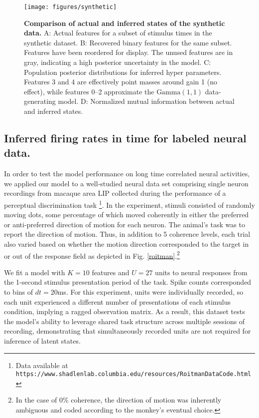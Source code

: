 \documentclass{nature}
\begin{document}
\begin{figure}
    \texttt{[image: figures/synthetic]}
	\caption{\textbf{Comparison of actual and inferred states of the synthetic data.} A: Actual features for a subset of stimulus times in the synthetic dataset. B: Recovered binary features for the same subset. Features have been reordered for display. The unused features are in gray, indicating a high posterior uncertainty in the model. C: Population posterior distributions for inferred hyper parameters. Features 3 and 4 are effectively point masses around gain 1 (no effect), while features 0--2 approximate the $\text{Gamma}(1, 1)$ data-generating model. D: Normalized mutual information between actual and inferred states.}
	\label{synthetic}
\end{figure}

\subsection{Inferred firing rates in time for labeled neural data.}
In order to test the model performance on long time correlated neural activities, we applied our model to a well-studied neural data set comprising single neuron recordings from macaque area LIP collected during the performance of a perceptual discrimination task \cite{roitman2002response}\footnote{Data available at \texttt{https://www.shadlenlab.columbia.edu/resources/RoitmanDataCode.html}}. In the experiment, stimuli consisted of randomly moving dots, some percentage of which moved coherently in either the preferred or anti-preferred direction of motion for each neuron. The animal's task was to report the direction of motion. Thus, in addition to 5 coherence levels, each trial also varied based on whether the motion direction corresponded to the target in or out of the response field as depicted in Fig. \ref{roitman}.\footnote{In the case of 0\% coherence, the direction of motion was inherently ambiguous and coded according to the monkey's eventual choice.}

We fit a model with $K = 10$ features and $U = 27$ units to neural responses from the 1-second stimulus presentation period of the task. Spike counts corresponded to bins of $dt = 20$ms. For this experiment, units were individually recorded, so each unit experienced a different number of presentations of each stimulus condition, implying a ragged observation matrix. As a result, this dataset tests the model's ability to leverage shared task structure across multiple sessions of recording, demonstrating that simultaneously recorded units are not required for inference of latent states.
\end{document}
